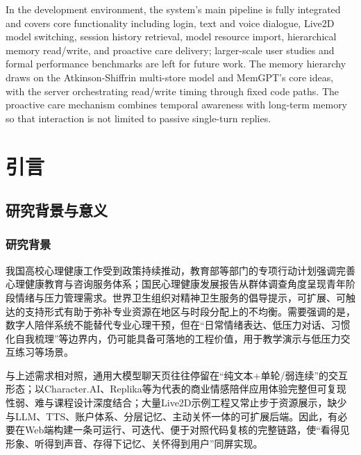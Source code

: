 \documentclass{base}
\begin{document}
\begin{enabstract}
In the development environment, the system's main pipeline is fully integrated and covers core functionality including login, text and voice dialogue, Live2D model switching, session history retrieval, model resource import, hierarchical memory read/write, and proactive care delivery; larger-scale user studies and formal performance benchmarks are left for future work. The memory hierarchy draws on the Atkinson-Shiffrin multi-store model and MemGPT's core ideas, with the server orchestrating read/write timing through fixed code paths. The proactive care mechanism combines temporal awareness with long-term memory so that interaction is not limited to passive single-turn replies.

\end{enabstract}

\clearpage
\mainbodytrue
{}
\pagestyle{mainstyle}

\chapter{引言}

\section{研究背景与意义}

\subsection{研究背景}

我国高校心理健康工作受到政策持续推动，教育部等部门的专项行动计划强调完善心理健康教育与咨询服务体系\cite{MOE2023}；国民心理健康发展报告从群体调查角度呈现青年阶段情绪与压力管理需求\cite{NMHReport2023}。世界卫生组织对精神卫生服务的倡导提示，可扩展、可触达的支持形式有助于弥补专业资源在地区与时段分配上的不均衡\cite{WHO2022}。需要强调的是，数字人陪伴系统不能替代专业心理干预，但在``日常情绪表达、低压力对话、习惯化自我梳理''等边界内，仍可能具备可落地的工程价值，用于教学演示与低压力交互练习等场景\cite{Picard1997,Bickmore2005}。

与上述需求相对照，通用大模型聊天页往往停留在``纯文本+单轮/弱连续''的交互形态；以Character.AI、Replika等为代表的商业情感陪伴应用体验完整但可复现性弱、难与课程设计深度结合\cite{CharacterAIAbout,ReplikaOfficial}；大量Live2D示例工程又常止步于资源展示，缺少与LLM、TTS、账户体系、分层记忆、主动关怀一体的可扩展后端\cite{live2d}。因此，有必要在Web端构建一条可运行、可迭代、便于对照代码复核的完整链路，使``看得见形象、听得到声音、存得下记忆、关怀得到用户''同屏实现。
\end{document}
